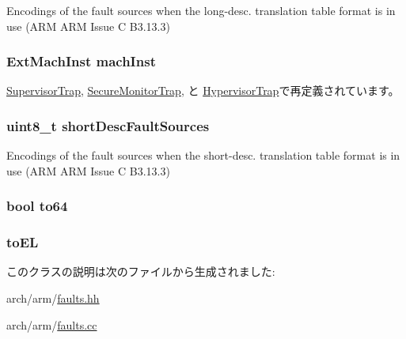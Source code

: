 \label{classArmISA_1_1ArmFault_af8144bca69405c504518999a068fe715}
Encodings of the fault sources when the long-\/desc. translation table format is in use (ARM ARM Issue C B3.13.3) \hypertarget{classArmISA_1_1ArmFault_a4a11fa8755d51be93a88861302a9378d}{
\subsubsection[{machInst}]{\setlength{\rightskip}{0pt plus 5cm}ExtMachInst {\bf machInst}}}
\label{classArmISA_1_1ArmFault_a4a11fa8755d51be93a88861302a9378d}


\hyperlink{classArmISA_1_1SupervisorTrap_a4a11fa8755d51be93a88861302a9378d}{SupervisorTrap}, \hyperlink{classArmISA_1_1SecureMonitorTrap_a4a11fa8755d51be93a88861302a9378d}{SecureMonitorTrap}, と \hyperlink{classArmISA_1_1HypervisorTrap_a4a11fa8755d51be93a88861302a9378d}{HypervisorTrap}で再定義されています。\hypertarget{classArmISA_1_1ArmFault_a9d1adbbd4c90a71fbe8e091316ddad20}{
\subsubsection[{shortDescFaultSources}]{\setlength{\rightskip}{0pt plus 5cm}uint8\_\-t {\bf shortDescFaultSources}}}
\label{classArmISA_1_1ArmFault_a9d1adbbd4c90a71fbe8e091316ddad20}
Encodings of the fault sources when the short-\/desc. translation table format is in use (ARM ARM Issue C B3.13.3) \hypertarget{classArmISA_1_1ArmFault_ab1a8b3123513ec016e7c11c08df5fe80}{
\subsubsection[{to64}]{\setlength{\rightskip}{0pt plus 5cm}bool {\bf to64}}}
\label{classArmISA_1_1ArmFault_ab1a8b3123513ec016e7c11c08df5fe80}
\hypertarget{classArmISA_1_1ArmFault_aa9dc1b3121ecbc002306990c12748cf3}{
\subsubsection[{toEL}]{ {\bf toEL}}}
\label{classArmISA_1_1ArmFault_aa9dc1b3121ecbc002306990c12748cf3}


このクラスの説明は次のファイルから生成されました:\begin{DoxyCompactItemize}
\item 
arch/arm/\hyperlink{arch_2arm_2faults_8hh}{faults.hh}\item 
arch/arm/\hyperlink{arch_2arm_2faults_8cc}{faults.cc}\end{DoxyCompactItemize}
